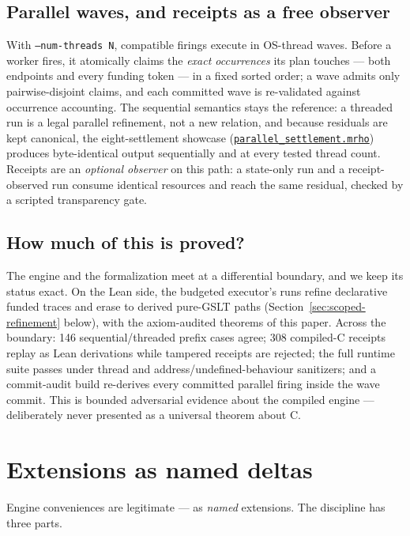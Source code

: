 \documentclass[11pt]{article}
\newcommand{\cettafile}[2]{\href{https://github.com/zariuq/CeTTa/blob/main/#1}{\code{#2}}}
\newcommand{\code}[1]{\texttt{#1}}
\begin{document}
\subsection{Parallel waves, and receipts as a free observer}

With \code{--num-threads N}, compatible firings execute in OS-thread
waves.  Before a worker fires, it atomically claims the \emph{exact
occurrences} its plan touches --- both endpoints and every funding token
--- in a fixed sorted order; a wave admits only pairwise-disjoint
claims, and each committed wave is re-validated against occurrence
accounting.  The sequential semantics stays the reference: a threaded
run is a legal parallel refinement, not a new relation, and because
residuals are kept canonical, the eight-settlement showcase
(\cettafile{examples/rho/cost/parallel_settlement.mrho}{parallel\_settlement.mrho})
produces byte-identical output sequentially and at every tested thread
count.  Receipts are an \emph{optional observer} on this path: a
state-only run and a receipt-observed run consume identical resources
and reach the same residual, checked by a scripted transparency gate.

\subsection{How much of this is proved?}

The engine and the formalization meet at a differential boundary, and we
keep its status exact.  On the Lean side, the budgeted executor's runs
refine declarative funded traces and erase to derived pure-GSLT paths
(Section~\ref{sec:scoped-refinement} below), with the axiom-audited
theorems of this paper.  Across the boundary: 146 sequential/threaded prefix
cases agree; 308 compiled-C receipts replay as Lean derivations while
tampered receipts are rejected; the full runtime suite passes under
thread and address/undefined-behaviour sanitizers; and a commit-audit
build re-derives every committed parallel firing inside the wave commit.
This is bounded adversarial evidence about the compiled engine ---
deliberately never presented as a universal theorem about C.

\section{Extensions as named deltas}
\label{sec:ext}

Engine conveniences are legitimate --- as \emph{named} extensions.
The discipline has three parts.
\end{document}
